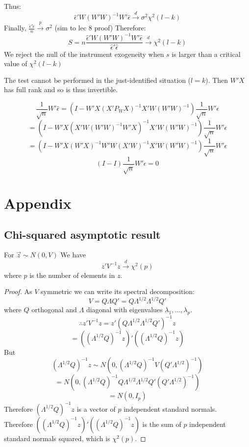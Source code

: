 \documentclass[DIV=14,titlepage=false]{scrreprt}
\begin{document}
Thus:
\[\hat\epsilon'W(W'W)^{-1}W'\hat\epsilon\xrightarrow{d}\sigma^2\chi^2(l-k)\]
Finally, \(\frac{\hat\epsilon'\hat\epsilon}{n}\xrightarrow{p}\sigma^2\) (sim to lec 8 proof)
Therefore:
\[S=n\frac{\hat\epsilon'W(W'W)^{-1}W'\hat\epsilon}{\hat\epsilon'\hat\epsilon}\xrightarrow{d}\chi^2(l-k)\]
We reject the null of the instrument exogeneity when \(s\) is larger than a critical value of \(\chi^2(l-k)\)
\begin{note}
The test cannot be performed in the just-identified situation (\(l=k)\).
Then \(W'X\) has full rank and so is thus invertible.

\[\frac{1}{\sqrt{n}}W'\hat\epsilon=(I-W'X(X'P_WX)^{-1}X'W(W'W)^{-1})\frac{1}{\sqrt{n}}W'\epsilon\]
\[=(I-W'X(X'W(W'W)^{-1}W'X)^{-1}X'W(W'W)^{-1})\frac{1}{\sqrt{n}}W'\epsilon\]
\[=(I-W'X(W'X)^{-1}W'W(X'W)^{-1}X'W(W'W)^{-1})\frac{1}{\sqrt{n}}W'\epsilon\]
\[(I-I)\frac{1}{\sqrt{n}}W'\epsilon=0\]

\end{note}
\section{Appendix}
\subsection{Chi-squared asymptotic result}
\vspace{5mm}
\begin{lemma}
For \(\vec z\sim N(0,V)\)
We have \[z'V^{-1}z\xrightarrow{d}\chi^2(p)\]
where \(p\) is the number of elements in \(z\).
\end{lemma}
\vspace{5mm}
\begin{proof}
    As \(V\) symmetric we can write its spectral decomposition:
    \[V=Q\Lambda Q'=Q\Lambda^{1/2}\Lambda^{1/2}Q'\]
    where \(Q\) orthogonal and \(\Lambda\) diagonal with eigenvalues \(\lambda_1,...,\lambda_p\).
    \[\therefore z'V^{-1}z=z'(Q\Lambda^{1/2}\Lambda^{1/2}Q')^{-1}z\]
    \[=((\Lambda^{1/2}Q)^{-1}z)'((\Lambda^{1/2}Q)^{-1}z)\]
    But
    \[(\Lambda^{1/2}Q)^{-1}z\sim N(0,(\Lambda^{1/2}Q)^{-1}V(Q'\Lambda^{1/2})^{-1})\]
    \[=N(0,(\Lambda^{1/2}Q)^{-1}Q\Lambda^{1/2}\Lambda^{1/2}Q'(Q'\Lambda^{1/2})^{-1})\]
    \[=N(0,I_p)\]
    Therefore \((\Lambda^{1/2}Q)^{-1}z\) is a vector of \(p\) independent standard normals.
    \\ Therefore \(((\Lambda^{1/2}Q)^{-1}z)'((\Lambda^{1/2}Q)^{-1}z)\) is the sum of \(p\) independent standard normals squared, which is \(\chi^2(p)\). 
\end{proof}
\end{document}
